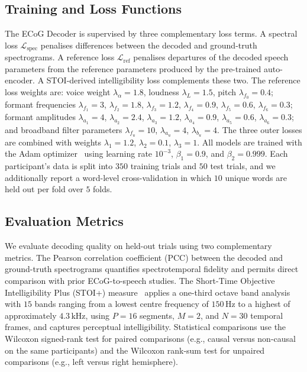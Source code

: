 \documentclass[11pt]{article}
\begin{document}
\subsection{Training and Loss Functions}

The ECoG Decoder is supervised by three complementary loss terms. A
spectral loss $\mathcal{L}_{\mathrm{spec}}$ penalises differences between
the decoded and ground-truth spectrograms. A reference loss
$\mathcal{L}_{\mathrm{ref}}$ penalises departures of the decoded speech
parameters from the reference parameters produced by the pre-trained
auto-encoder. A STOI-derived intelligibility loss complements these two.
The reference loss weights are: voice weight $\lambda_\alpha = 1.8$,
loudness $\lambda_L = 1.5$, pitch $\lambda_{f_0} = 0.4$; formant
frequencies $\lambda_{f_1}=3$, $\lambda_{f_2}=1.8$, $\lambda_{f_3}=1.2$,
$\lambda_{f_4}=0.9$, $\lambda_{f_5}=0.6$, $\lambda_{f_6}=0.3$; formant
amplitudes $\lambda_{a_1}=4$, $\lambda_{a_2}=2.4$, $\lambda_{a_3}=1.2$,
$\lambda_{a_4}=0.9$, $\lambda_{a_5}=0.6$, $\lambda_{a_6}=0.3$; and
broadband filter parameters $\lambda_{f_u}=10$, $\lambda_{a_u}=4$,
$\lambda_{b_u}=4$. The three outer losses are combined with weights
$\lambda_1=1.2$, $\lambda_2=0.1$, $\lambda_3=1$. All models are trained
with the Adam optimizer~\cite{kingma2015adam} using learning rate
$10^{-3}$, $\beta_1=0.9$, and $\beta_2=0.999$. Each participant's data is
split into $350$ training trials and $50$ test trials, and we additionally
report a word-level cross-validation in which $10$ unique words are held
out per fold over $5$ folds.

\subsection{Evaluation Metrics}

We evaluate decoding quality on held-out trials using two complementary
metrics. The Pearson correlation coefficient (PCC) between the decoded and
ground-truth spectrograms quantifies spectrotemporal fidelity and permits
direct comparison with prior ECoG-to-speech studies. The Short-Time
Objective Intelligibility Plus (STOI+) measure~\cite{taal2011algorithm}
applies a one-third octave band analysis with $15$ bands ranging from a
lowest centre frequency of $150\,\mathrm{Hz}$ to a highest of
approximately $4.3\,\mathrm{kHz}$, using $P=16$ segments, $M=2$, and
$N=30$ temporal frames, and captures perceptual intelligibility.
Statistical comparisons use the Wilcoxon signed-rank test for paired
comparisons (e.g., causal versus non-causal on the same participants) and
the Wilcoxon rank-sum test for unpaired comparisons (e.g., left versus
right hemisphere).
\end{document}
